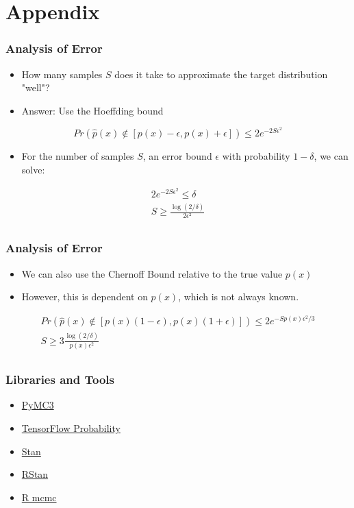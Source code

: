 \documentclass{beamer}
\begin{document}
\section{Appendix}
\begin{frame}
  \frametitle{Analysis of Error}
  \begin{itemize}
    \item How many samples $S$ does it take to approximate the target distribution "well"?
    \item Answer: Use the Hoeffding bound
  \end{itemize}
  \begin{equation*}
    Pr \left( \hat{p}(x) \not\in \left[p(x) - \epsilon, p(x) + \epsilon \right] \right) \leq 2 e^{-2S \epsilon^2}
  \end{equation*}
  \begin{itemize}
    \item For the number of samples $S$, an error bound $\epsilon$ with probability $1 - \delta$,
      we can solve:
  \end{itemize}
  \begin{gather*}
    2e^{-2S \epsilon^2} \leq \delta \\
    S \geq \frac{\log(2 / \delta)}{2 \epsilon^2}  \\
  \end{gather*}
\end{frame}

\begin{frame}
  \frametitle{Analysis of Error}
  \begin{itemize}
    \item We can also use the Chernoff Bound relative to the true value $p(x)$
    \item However, this is dependent on $p(x)$, which is not always known.
  \end{itemize}
  \begin{gather*}
    Pr \left( \hat{p}(x) \not\in \left[p(x)(1 - \epsilon), p(x)(1 + \epsilon) \right] \right) \leq 2 e^{-S p(x) \epsilon^2 / 3} \\
    S \geq 3 \frac{\log \left(2 / \delta \right)}{p(x) \epsilon^2} \\
  \end{gather*}
\end{frame}



\begin{frame}
  \frametitle{Libraries and Tools}
  \begin{itemize}
    \item \href{https://pymc-devs.github.io/pymc3/}{PyMC3}
    \item \href{https://www.tensorflow.org/probability/}{TensorFlow Probability}
    \item \href{http://mc-stan.org}{Stan}
    \item \href{https://mc-stan.org/users/interfaces/rstan}{RStan}
    \item \href{https://cran.r-project.org/web/packages/mcmc/index.html}{R mcmc}
  \end{itemize}
\end{frame}
\end{document}
